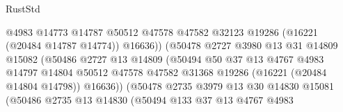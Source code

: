\begin{lexlean}{RustStd}
\begin{coremodule}
                                          @4983
                                          @14773
                                          @14787
                                          @50512
                                          @47578
                                          @47582
                                          @32123
                                          @19286
                                          (@16221 (@20484 @14787 @14774))
                                          @16636))
                                      (@50478
                                        @2727
                                        @3980
                                        @13
                                        @31
                                        @14809
                                        @15082
                                        (@50486
                                          @2727
                                          @13
                                          @14809
                                          (@50494
                                            @50
                                            @37
                                            @13
                                            @4767
                                            @4983
                                            @14797
                                            @14804
                                            @50512
                                            @47578
                                            @47582
                                            @31368
                                            @19286
                                            (@16221 (@20484 @14804 @14798))
                                            @16636))
                                        (@50478
                                          @2735
                                          @3979
                                          @13
                                          @30
                                          @14830
                                          @15081
                                          (@50486
                                            @2735
                                            @13
                                            @14830
                                            (@50494
                                              @133
                                              @37
                                              @13
                                              @4767
                                              @4983

\end{coremodule}
\end{lexlean}
